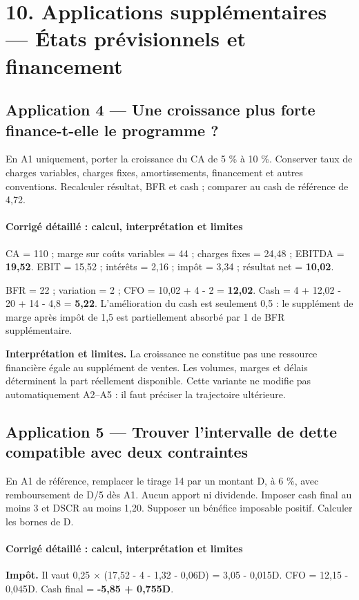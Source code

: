 \documentclass[12pt,a4paper]{article}
\begin{document}
\section*{10. Applications supplémentaires --- États prévisionnels et financement}

\subsection*{Application 4 --- Une croissance plus forte finance-t-elle le programme ?}
En A1 uniquement, porter la croissance du CA de 5 \% à 10 \%. Conserver taux de charges variables, charges fixes, amortissements, financement et autres conventions. Recalculer résultat, BFR et cash ; comparer au cash de référence de 4,72.


\paragraph{Corrigé détaillé : calcul, interprétation et limites}
CA = 110 ; marge sur coûts variables = 44 ; charges fixes = 24,48 ; EBITDA = \textbf{19,52}. EBIT = 15,52 ; intérêts = 2,16 ; impôt = 3,34 ; résultat net = \textbf{10,02}.

BFR = 22 ; variation = 2 ; CFO = 10,02 + 4 - 2 = \textbf{12,02}. Cash = 4 + 12,02 - 20 + 14 - 4,8 = \textbf{5,22}. L’amélioration du cash est seulement 0,5 : le supplément de marge après impôt de 1,5 est partiellement absorbé par 1 de BFR supplémentaire.

\textbf{Interprétation et limites.} La croissance ne constitue pas une ressource financière égale au supplément de ventes. Les volumes, marges et délais déterminent la part réellement disponible. Cette variante ne modifie pas automatiquement A2--A5 : il faut préciser la trajectoire ultérieure.


\subsection*{Application 5 --- Trouver l’intervalle de dette compatible avec deux contraintes}
En A1 de référence, remplacer le tirage 14 par un montant D, à 6 \%, avec remboursement de D/5 dès A1. Aucun apport ni dividende. Imposer cash final au moins 3 et DSCR au moins 1,20. Supposer un bénéfice imposable positif. Calculer les bornes de D.


\paragraph{Corrigé détaillé : calcul, interprétation et limites}
\textbf{Impôt.} Il vaut 0,25 $\times$ (17,52 - 4 - 1,32 - 0,06D) = 3,05 - 0,015D. CFO = 12,15 - 0,045D. Cash final = \textbf{-5,85 + 0,755D}.
\end{document}
